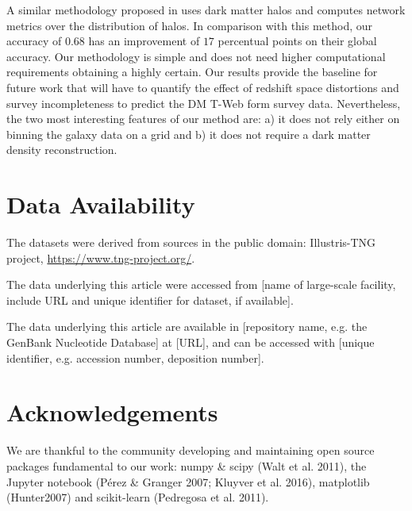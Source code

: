 \documentclass[usenatbib]{mnras}
\begin{document}
{A similar methodology proposed in \cite{Tsizh2019} uses dark matter halos and computes network metrics over the distribution of halos. In comparison with this method, our accuracy of $0.68$ has an improvement of $17$ percentual points on their global accuracy. Our methodology is simple and does not need higher computational requirements obtaining a highly certain. Our results provide the baseline for future work that will have to quantify the effect of redshift space distortions and survey incompleteness to predict the DM T-Web form survey data.
Nevertheless, the two most interesting features of our method are: a) it does not rely either on binning the galaxy data on a grid and b) it does not require a dark matter density reconstruction.


\section*{Data Availability}

The datasets were derived from sources in the public domain: Illustris-TNG project, \url{https://www.tng-project.org/}.

The data underlying this article were accessed from [name of large-scale facility, include URL and unique identifier for dataset, if available].

The data underlying this article are available in [repository name, e.g. the GenBank Nucleotide Database] at [URL], and can be accessed with [unique identifier, e.g. accession number, deposition number].
}

\section*{Acknowledgements}

We are thankful to the community developing and maintaining open source packages fundamental to our work: numpy
\&  scipy  (Walt  et  al.  2011),  the  Jupyter  notebook  (P\'erez \& Granger 2007; Kluyver et al. 2016), matplotlib (Hunter2007) and  scikit-learn (Pedregosa et al. 2011).






\bsp	%
\label{lastpage}
\end{document}
